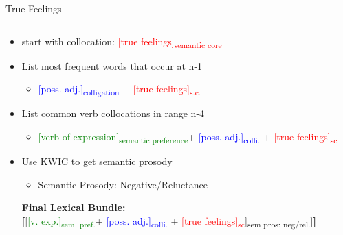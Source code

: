 \documentclass{beamer}
\begin{document}
\begin{frame}{True Feelings}
	\begin{columns}
    	\begin{column}{15cm}
            \begin{itemize} 
            \pause
            \item start with collocation: \textcolor{red}{{[true feelings]}\textsubscript{semantic core}}
            \pause
            \item List most frequent words that occur at n-1
            	\begin{itemize}
                	\pause
                    \item \textcolor{blue}{{[poss. adj.]}\textsubscript{colligation}} + \textcolor{red}{{[true feelings]}\textsubscript{s.c.}}
            	\end{itemize}
            \pause
            \item List common verb collocations in range n-4
            	\begin{itemize}
                	\pause
                    \item \textcolor{green}{{[verb of expression]}\textsubscript{semantic preference}}+ \textcolor{blue}{{[poss. adj.]}\textsubscript{colli.}} + \textcolor{red}{{[true feelings]}\textsubscript{sc}}
            	\end{itemize}   
             \pause
             \item Use KWIC to get semantic prosody
             	\begin{itemize}
            		\pause
                    \item Semantic Prosody: Negative/Reluctance 
             	\end{itemize}
                \vspace{2em}
                \pause
                \textbf{Final Lexical Bundle:} \\
                	\textbf{{[}}{[\textcolor{green}{{[v. exp.]}\textsubscript{sem. pref.}}+ \textcolor{blue}{{[poss. adj.]}\textsubscript{colli.}} + \textcolor{red}{{[true feelings]}\textsubscript{sc}}]}\textsubscript{sem pros: neg/rel.}{]}\textbf{{]}}
            \end{itemize}
        \end{column}   
    \end{columns}
\end{frame}




\end{document}
